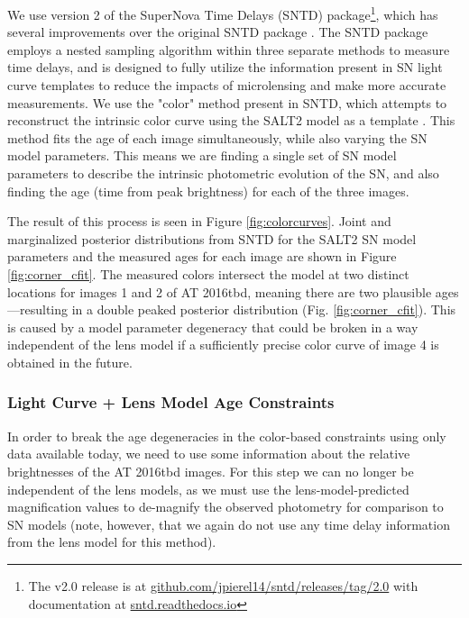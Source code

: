 \documentclass[12pt]{article}
\def\SNABC{AT 2016tbd\xspace}
\begin{document}
{We use version 2 of the SuperNova Time Delays (SNTD) package\footnote{The v2.0 release is at \href{https://github.com/jpierel14/sntd/releases/tag/2.0}{github.com/jpierel14/sntd/releases/tag/2.0} with documentation at 
\href{https://sntd.readthedocs.io/en/latest/}{sntd.readthedocs.io}}, which has several improvements over the original SNTD package \cite{pierel_turning_2019}. The SNTD package employs a nested sampling algorithm within three separate methods to measure time delays, and is designed to fully utilize the information present in SN light curve templates \cite{hsiao_k_2007,guy_salt2:_2007,kessler_results_2010,pierel_extending_2018} to reduce the impacts of microlensing and make more accurate measurements. We use the "color" method present in SNTD, which attempts to reconstruct the intrinsic color curve using the SALT2 model as a template \cite{guy_salt2:_2007}. This method fits the age of each image simultaneously, while also varying the SN model parameters.  This means we are finding a single set of SN model parameters to describe the intrinsic photometric evolution of the SN, and also finding the age (time from peak brightness) for each of the three images.

The result of this process is seen in Figure \ref{fig:colorcurves}.  Joint and marginalized posterior distributions
from SNTD for the SALT2 SN model parameters and the measured ages for each image are shown in Figure \ref{fig:corner_cfit}.  The measured colors intersect the model at two distinct locations for images 1 and 2 of \SNABC, meaning there are two plausible ages---resulting in a double peaked posterior distribution (Fig. \ref{fig:corner_cfit}). This is caused by a model parameter degeneracy that could be broken in a way independent of the lens model if a sufficiently precise color curve of image 4 is obtained in the future.


\subsubsection*{Light Curve + Lens Model Age Constraints}

In order to break the age degeneracies in the color-based constraints using only data available today, we need to use some information about the relative brightnesses of the \SNABC images.  For this step we can no longer be independent of the lens models, as we must use the lens-model-predicted magnification values to de-magnify the observed photometry for comparison to SN models (note, however, that we again do not use any time delay information from the lens model for this method).

}
\end{document}
